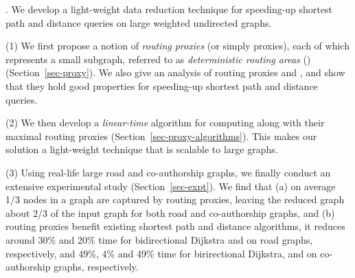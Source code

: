 . We develop a light-weight data reduction technique for speeding-up shortest  path and distance queries on large weighted undirected graphs.



\stab (1) We first propose a notion of {\em routing proxies} (or simply proxies), each of which represents a small subgraph, referred to as  {\em deterministic routing areas} (\dras)  (Section~\ref{sec-proxy}). We also give an analysis of routing proxies and \dras, and show that they hold good properties for speeding-up shortest path and distance queries.

\stab (2) We then develop a {\em linear-time} algorithm for computing \dras along with their maximal routing proxies (Section~\ref{sec-proxy-algorithms}). This makes our solution a light-weight technique that is scalable to large graphs.


\stab (3) Using real-life large road and co-authorship graphs, we finally conduct an extensive experimental study (Section~\ref{sec-expt}).
We find that (a) on average 1/3 nodes in a graph are captured by routing proxies, leaving the reduced graph about 2/3 of the input graph for both road and co-authorship graphs, and  (b) routing proxies benefit existing shortest  path and distance algorithms, \eg it reduces around 30\% and 20\% time for  bidirectional Dijkstra \cite{LubyR89} and \arcflag \cite{MohringSSWW05} on road graphs, respectively, and 49\%, 4\% and 49\% time for birirectional Dijkstra, \arcflag and \tnr \cite{arz2013transit} on co-authorship graphs, respectively.








